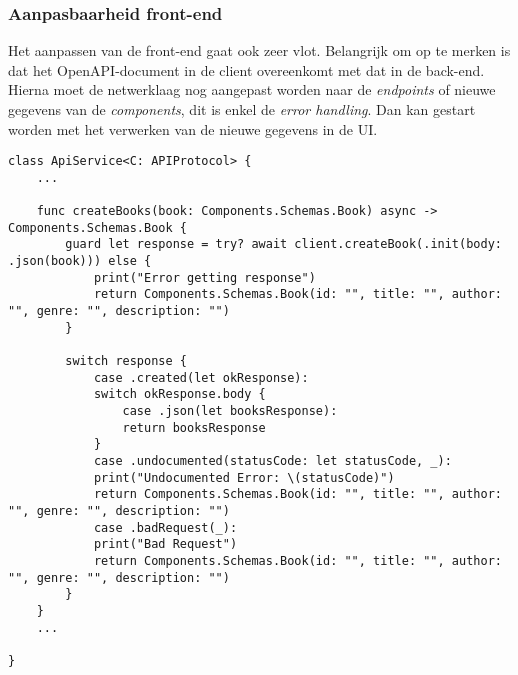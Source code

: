 \subsubsection{Aanpasbaarheid front-end}
Het aanpassen van de front-end gaat ook zeer vlot. Belangrijk om op te merken is dat het OpenAPI-document in de client overeenkomt met dat in de back-end. Hierna moet de netwerklaag nog aangepast worden naar de \textit{endpoints} of nieuwe gegevens van de \textit{components}, dit is enkel de \textit{error handling}. Dan kan gestart worden met het verwerken van de nieuwe gegevens in de UI.

\begin{lstlisting}[caption=ApiService file]
class ApiService<C: APIProtocol> {
    ...
   
    func createBooks(book: Components.Schemas.Book) async -> Components.Schemas.Book {
        guard let response = try? await client.createBook(.init(body: .json(book))) else {
            print("Error getting response")
            return Components.Schemas.Book(id: "", title: "", author: "", genre: "", description: "")
        }
        
        switch response {
            case .created(let okResponse):
            switch okResponse.body {
                case .json(let booksResponse):
                return booksResponse
            }
            case .undocumented(statusCode: let statusCode, _):
            print("Undocumented Error: \(statusCode)")
            return Components.Schemas.Book(id: "", title: "", author: "", genre: "", description: "")
            case .badRequest(_):
            print("Bad Request")
            return Components.Schemas.Book(id: "", title: "", author: "", genre: "", description: "")
        }
    }
    ...
    
}

\end{lstlisting}